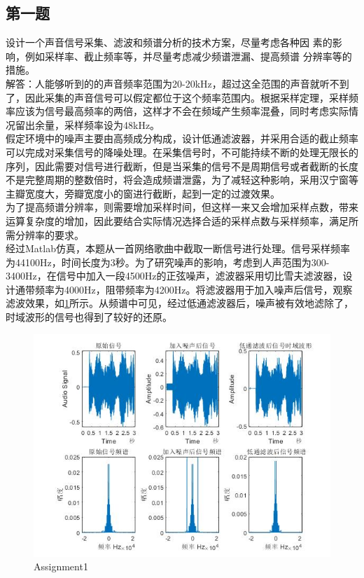 \documentclass{seuer}
\begin{document}
\subsection{第一题}
设计一个声音信号采集、滤波和频谱分析的技术方案，尽量考虑各种因
素的影响，例如采样率、截止频率等，并尽量考虑减少频谱泄漏、提高频谱
分辨率等的措施。
\\解答：人能够听到的的声音频率范围为20-20kHz，超过这全范围的声音就听不到了，因此采集的声音信号可以假定都位于这个频率范围内。根据采样定理，采样频率应该为信号最高频率的两倍，这样才不会在频域产生频率混叠，同时考虑实际情况留出余量，采样频率设为48kHz。
\\假定环境中的噪声主要由高频成分构成，设计低通滤波器，并采用合适的截止频率可以完成对采集信号的降噪处理。在采集信号时，不可能持续不断的处理无限长的序列，因此需要对信号进行截断，但是当采集的信号不是周期信号或者截断的长度不是完整周期的整数倍时，将会造成频谱泄露，为了减轻这种影响，采用汉宁窗等主瓣宽度大，旁瓣宽度小的窗进行截断，起到一定的过渡效果。
\\为了提高频谱分辨率，则需要增加采样时间，但这样一来又会增加采样点数，带来运算复杂度的增加，因此要结合实际情况选择合适的采样点数与采样频率，满足所需分辨率的要求。
\\经过Matlab仿真，本题从一首网络歌曲中截取一断信号进行处理。信号采样频率为44100Hz，时间长度为3秒。为了研究噪声的影响，考虑到人声范围为300-3400Hz，在信号中加入一段4500Hz的正弦噪声，滤波器采用切比雪夫滤波器，设计通带频率为4000Hz，阻带频率为4200Hz。将滤波器用于加入噪声后信号，观察滤波效果，如\ref{Fig1}所示。从频谱中可见，经过低通滤波器后，噪声被有效地滤除了，时域波形的信号也得到了较好的还原。
\begin{figure}[H] %
	\centering %
	\includegraphics[width=1\textwidth]{"../DSPAssignment/Assignment1.jpg"} %
	\caption{Assignment1} %
	\label{Fig1} %
\end{figure}
\end{document}
